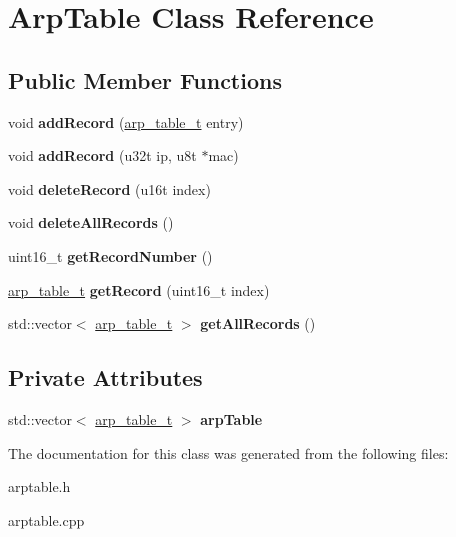 \hypertarget{classArpTable}{}\section{Arp\+Table Class Reference}
\label{classArpTable}
\subsection*{Public Member Functions}
\begin{DoxyCompactItemize}
\item 
\mbox{\label{classArpTable_a73005ba2b1e7a304ca8e52fc248fa088}} 
void {\bfseries add\+Record} (\mbox{\hyperlink{structarp__table__t}{arp\+\_\+table\+\_\+t}} entry)
\item 
\mbox{\label{classArpTable_a50ff8a76494c612b9d9a3e0959a22319}} 
void {\bfseries add\+Record} (u32t ip, u8t $\ast$mac)
\item 
\mbox{\label{classArpTable_a82253f8a60a10ccf891523af60127107}} 
void {\bfseries delete\+Record} (u16t index)
\item 
\mbox{\label{classArpTable_a2caff3ffc36cabf9a3bfc08791fc54c3}} 
void {\bfseries delete\+All\+Records} ()
\item 
\mbox{\label{classArpTable_a7ccaac9af85787a5d0ac606e7f35d68c}} 
uint16\+\_\+t {\bfseries get\+Record\+Number} ()
\item 
\mbox{\label{classArpTable_a74f045fa2052bfd3d54a61369862e434}} 
\mbox{\hyperlink{structarp__table__t}{arp\+\_\+table\+\_\+t}} {\bfseries get\+Record} (uint16\+\_\+t index)
\item 
\mbox{\label{classArpTable_ae546c9a5a0a1711caa273c62840cc04c}} 
std\+::vector$<$ \mbox{\hyperlink{structarp__table__t}{arp\+\_\+table\+\_\+t}} $>$ {\bfseries get\+All\+Records} ()
\end{DoxyCompactItemize}
\subsection*{Private Attributes}
\begin{DoxyCompactItemize}
\item 
\mbox{\label{classArpTable_a81b942abf2c4e35ca7790939595f59b3}} 
std\+::vector$<$ \mbox{\hyperlink{structarp__table__t}{arp\+\_\+table\+\_\+t}} $>$ {\bfseries arp\+Table}
\end{DoxyCompactItemize}


The documentation for this class was generated from the following files\+:\begin{DoxyCompactItemize}
\item 
arptable.\+h\item 
arptable.\+cpp\end{DoxyCompactItemize}
